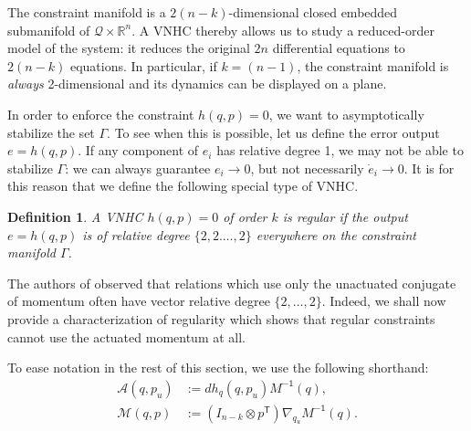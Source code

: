 \documentclass[journal,twoside,web, twocolumn,draftcls]{ieeecolor}
\newtheorem{defn}{Definition} %
\newcommand*{\tpose}{^\mathsf{T}}
\newcommand*{\R}{\mathbb{R}}
\newcommand*{\Minv}{M^\mathsf{-1}}
\newcommand*{\Id}[1]{I_{#1}}
\begin{document}
The constraint manifold is a \(2(n-k)\)-dimensional
closed embedded submanifold of \(\mathcal{Q} \times \R^n\).
A VNHC thereby allows us to study a reduced-order model of the system: it reduces
the original \(2n\) differential equations to \(2(n-k)\) equations.
In particular, if \(k = (n-1)\), the constraint manifold is \textit{always}
2-dimensional and its dynamics can be displayed on a plane. 

In order to enforce the constraint \(h(q,p) = 0\), we want to asymptotically
stabilize the set \(\Gamma\).
To see when this is possible, let us define the error output \(e = h(q,p)\).
If any component of \(e_i\) has relative degree 1, we may not be able
to stabilize \(\Gamma\): we can always guarantee \(e_i \to 0\), but not
necessarily \(\dot{e}_i \to 0\).
It is for this reason that we define the following special type of VNHC.

\begin{defn}
    A VNHC \(h(q,p) = 0\) of order \(k\) is \textit{regular} if the output 
    \(e = h(q,p)\) is of relative degree \(\{2,2.\ldots,2\}\) everywhere on the
    constraint manifold \(\Gamma\).
\end{defn}

The authors of
\cite{nhvc_dynamic_walking,hybrid_zero_dynamics_bipedal_nhvcs}
observed that relations which use only the unactuated conjugate of momentum
often have vector relative degree \(\{2,\ldots,2\}\).
Indeed, we shall now provide a characterization of regularity which shows that
regular constraints cannot use the actuated momentum at all.

To ease notation in the rest of this section, we use the following shorthand:
\begin{align}
    \mathcal{A}(q,p_u) &:= dh_q(q,p_u) \Minv(q) 
        ,\\
    \mathcal{M}(q,p) &:= (\Id{n-k} \otimes p\tpose)\nabla_{q_u}\Minv(q) 
    .
\end{align}
\end{document}
